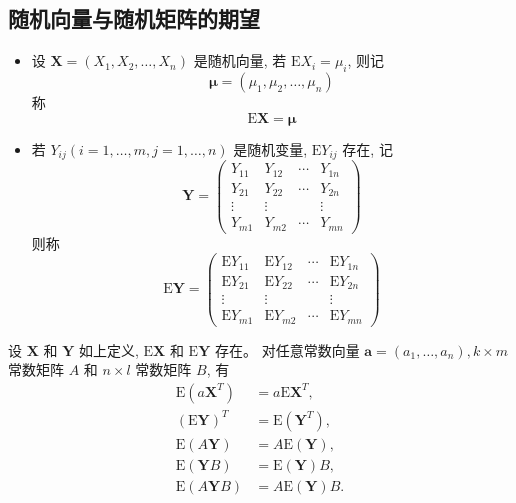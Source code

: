 \subsection{随机向量与随机矩阵的期望}

\begin{itemize}
    \item 设 $\boldsymbol{X}=\left(X_1, X_2, \ldots, X_n\right)$ 是随机向量, 若 $\mathrm{E} X_i=\mu_i$, 则记
          $$
              \boldsymbol{\mu}=\left(\mu_1, \mu_2, \ldots, \mu_n\right)
          $$
          称
          $$
              \mathrm{E} \boldsymbol{X}=\boldsymbol{\mu}
          $$
    \item 若 $Y_{i j}(i=1, \ldots, m, j=1, \ldots, n)$ 是随机变量, $\mathrm{E} Y_{i j}$ 存在, 记
          $$
              \boldsymbol{Y}=\left(\begin{array}{cccc}
                      Y_{11}  & Y_{12}  & \cdots & Y_{1 n} \\
                      Y_{21}  & Y_{22}  & \cdots & Y_{2 n} \\
                      \vdots  & \vdots  &        & \vdots  \\
                      Y_{m 1} & Y_{m 2} & \cdots & Y_{m n}
                  \end{array}\right)
          $$
          则称
          $$
              \mathrm{E} \boldsymbol{Y}=\left(\begin{array}{cccc}
                      \mathrm{E} Y_{11}  & \mathrm{E} Y_{12}  & \cdots & \mathrm{E} Y_{1 n} \\
                      \mathrm{E} Y_{21}  & \mathrm{E} Y_{22}  & \cdots & \mathrm{E} Y_{2 n} \\
                      \vdots             & \vdots             &        & \vdots             \\
                      \mathrm{E} Y_{m 1} & \mathrm{E} Y_{m 2} & \cdots & \mathrm{E} Y_{m n}
                  \end{array}\right)
          $$
\end{itemize}
设 $\boldsymbol{X}$ 和 $\boldsymbol{Y}$ 如上定义, $\mathrm{E} \boldsymbol{X}$ 和 $\mathrm{E} \boldsymbol{Y}$ 存在。
对任意常数向量 $\boldsymbol{a}=\left(a_1, \ldots, a_n\right), k \times m$ 常数矩阵 $A$ 和 $n \times l$ 常数矩阵 $B$, 有
$$
    \begin{aligned}
        \mathrm{E}\left(a \boldsymbol{X}^T\right) & =a \mathrm{E} \boldsymbol{X}^T,           \\
        (\mathrm{E} \boldsymbol{Y})^T             & =\mathrm{E}\left(\boldsymbol{Y}^T\right), \\
        \mathrm{E}(A \boldsymbol{Y})              & =A \mathrm{E}(\boldsymbol{Y}),            \\
        \mathrm{E}(\boldsymbol{Y} B)              & =\mathrm{E}(\boldsymbol{Y}) B,            \\
        \mathrm{E}(A \boldsymbol{Y} B)            & =A \mathrm{E}(\boldsymbol{Y}) B .
    \end{aligned}
$$

